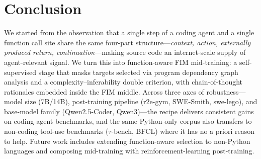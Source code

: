 \section{Conclusion}
\vspace{-0.5ex}
\label{sec:conclusion}

We started from the observation that a single step of a coding agent and
a single function call site share the same four-part structure---\textit{context,
action, externally produced return, continuation}---making source code an
internet-scale supply of agent-relevant signal. We turn this into
function-aware FIM mid-training: a self-supervised stage that masks
targets selected via program dependency graph analysis and a
complexity--inferability double criterion, with chain-of-thought
rationales embedded inside the FIM middle. Across three axes of
robustness---model size (7B/14B), post-training pipeline (r2e-gym,
SWE-Smith, swe-lego), and base-model family (Qwen2.5-Coder, Qwen3)---the
recipe delivers consistent gains on coding-agent benchmarks, and the
same Python-only corpus also transfers to non-coding tool-use benchmarks
($\tau$-bench, BFCL) where it has no a priori reason to help. Future
work includes extending function-aware selection to non-Python languages
and composing mid-training with reinforcement-learning post-training.

